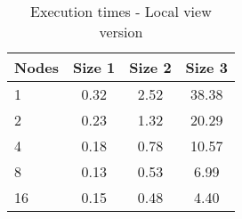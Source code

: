 \documentclass{article}
\begin{document}
\begin{table}[H]
\centering
\begin{tabular}{|l|c|c|c|}
\hline
Nodes & Size 1 & Size 2 & Size 3 \\ \hline
1 & 0.32 & 2.52 & 38.38 \\ \hline
2 & 0.23 & 1.32 & 20.29 \\ \hline
4 & 0.18 & 0.78 & 10.57 \\ \hline
8 & 0.13 & 0.53 & 6.99 \\ \hline
16 & 0.15 & 0.48 & 4.40 \\ \hline
\end{tabular}
\caption{Execution times - Local view version} \label{tab:localviewtimes}
\end{table}
\end{document}
